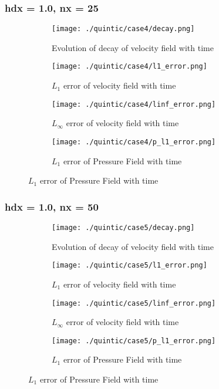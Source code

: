 \documentclass[11pt, a4paper]{article}
\begin{document}
\subsubsection{hdx = 1.0, nx = 25}
\begin{figure}[H]
\begin{subfigure}{0.48\textwidth}
\texttt{[image: ./quintic/case4/decay.png]}
\caption{Evolution of decay of velocity field with time}
\end{subfigure}
\begin{subfigure}{0.48\textwidth}
\texttt{[image: ./quintic/case4/l1\_error.png]}
\caption{$L_1$ error of velocity field with time}
\end{subfigure}
\medskip
\begin{subfigure}{0.48\textwidth}
\texttt{[image: ./quintic/case4/linf\_error.png]}
\caption{$L_\infty$ error of velocity field with time}
\end{subfigure}
\begin{subfigure}{0.48\textwidth}
\texttt{[image: ./quintic/case4/p\_l1\_error.png]}
\caption{$L_1$ error of Pressure Field with time}
\end{subfigure}
\end{figure}

\subsubsection{hdx = 1.0, nx = 50}
\begin{figure}[H]
\begin{subfigure}{0.48\textwidth}
\texttt{[image: ./quintic/case5/decay.png]}
\caption{Evolution of decay of velocity field with time}
\end{subfigure}
\begin{subfigure}{0.48\textwidth}
\texttt{[image: ./quintic/case5/l1\_error.png]}
\caption{$L_1$ error of velocity field with time}
\end{subfigure}
\medskip
\begin{subfigure}{0.48\textwidth}
\texttt{[image: ./quintic/case5/linf\_error.png]}
\caption{$L_\infty$ error of velocity field with time}
\end{subfigure}
\begin{subfigure}{0.48\textwidth}
\texttt{[image: ./quintic/case5/p\_l1\_error.png]}
\caption{$L_1$ error of Pressure Field with time}
\end{subfigure}
\end{figure}
\end{document}
